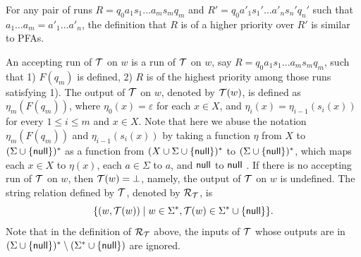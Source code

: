 For any pair of runs $R = q_0 a_1 s_1 \ldots a_m s_m q_m$ and $R' = q_0 a'_1
  s_1' \ldots a'_n s_n' q_n'$ such that $a_1 \ldots a_m = a'_1 \ldots a'_n$, the definition that $R$ is of a higher priority over
  $R'$ is similar to PFAs.
  
An accepting run of $\mathcal{T}$ on $w$ is a run of $\mathcal{T}$ on $w$, say $R = q_0 a_1 s_1 \ldots a_m s_m q_m$, such that 1) $F(q_m)$ is defined, 2)  $R$ is of the highest priority among those runs satisfying 1). The output of $\mathcal{T}$ on $w$, denoted by $\mathcal{T}(w)$, is defined as $\eta_m(F(q_m))$, where $\eta_0(x) = \varepsilon$ for each $x \in X$, and $\eta_{i}(x) = \eta_{i-1}(s_{i}(x))$ for every $1 \le i \le m$ and $x \in X$. Note that here we abuse the notation $\eta_m(F(q_m))$ and $\eta_{i-1}(s_{i}(x))$ by taking a function $\eta$ from $X$ to $(\Sigma \cup \{\mathsf{null}\} )^*$ as a function from $(X \cup \Sigma \cup \{\mathsf{null}\})^*$ to $(\Sigma \cup \{\mathsf{null}\})^*$, which maps each $x \in X$ to $\eta(x)$, each $a \in \Sigma$ to $a$, and $\mathsf{null}$ to $\mathsf{null}$ . If there is no accepting run of $\mathcal{T}$ on $w$, then $\mathcal{T}(w) = \bot$, namely, the output of $\mathcal{T}$ on $w$ is undefined. The string relation defined by $\mathcal{T}$, denoted by $\mathcal{R}_{\mathcal{T}}$,  is 
$$\{(w, \mathcal{T}(w)) \mid w \in \Sigma^\ast, \mathcal{T}(w)  \in \Sigma^* \cup \{\mathsf{null}\}\}.$$
Note that in the definition of $\mathcal{R}_{\mathcal{T}}$ above, the inputs of $\mathcal{T}$ whose outputs are in $(\Sigma \cup \{\mathsf{null}\})^* \setminus (\Sigma^* \cup \{\mathsf{null}\})$ are ignored.

